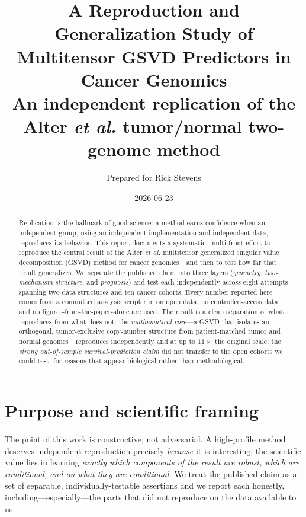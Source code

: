 \documentclass[11pt]{article}
\title{\vspace{-1.5cm}\textbf{A Reproduction and Generalization Study of\\
Multitensor GSVD Predictors in Cancer Genomics}\\[4pt]
\large An independent replication of the Alter \emph{et al.} tumor/normal
two-genome method}
\author{Prepared for Rick Stevens}
\date{2026-06-23}
\begin{document}
\maketitle
\thispagestyle{fancy}

\begin{abstract}
\noindent
Replication is the hallmark of good science: a method earns confidence when an
independent group, using an independent implementation and independent data,
reproduces its behavior. This report documents a systematic, multi-front effort
to reproduce the central result of the Alter \emph{et al.} multitensor
generalized singular value decomposition (GSVD) method for cancer
genomics---and then to test how far that result generalizes. We separate the
published claim into three layers (\emph{geometry}, \emph{two-mechanism
structure}, and \emph{prognosis}) and test each independently across eight
attempts spanning two data structures and ten cancer cohorts. Every number
reported here comes from a committed analysis script run on open data; no
controlled-access data and no figures-from-the-paper-alone are used. The result
is a clean separation of what reproduces from what does not: the
\emph{mathematical core}---a GSVD that isolates an orthogonal, tumor-exclusive
copy-number structure from patient-matched tumor and normal genomes---reproduces
independently and at up to $11\times$ the original scale; the \emph{strong
out-of-sample survival-prediction claim} did not transfer to the open cohorts we
could test, for reasons that appear biological rather than methodological.
\end{abstract}

\tableofcontents
\vspace{0.5cm}

\section{Purpose and scientific framing}

The point of this work is constructive, not adversarial. A high-profile method
deserves independent reproduction precisely \emph{because} it is interesting; the
scientific value lies in learning \emph{exactly which components of the result are
robust, which are conditional, and on what they are conditional.} We treat the
published claim as a set of separable, individually-testable assertions and we
report each honestly, including---especially---the parts that did not reproduce
on the data available to us.
\end{document}
